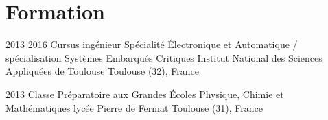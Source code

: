 \documentclass{custom_cv}
\begin{document}
\section{Formation}
\begin{Experience}
    \Item
    {2013}
    {2016}
    {Cursus ingénieur}
    {Spécialité Électronique et Automatique / spécialisation Systèmes Embarqués Critiques}
    {Institut National des Sciences Appliquées de Toulouse}
    {Toulouse (32), France}

    {2013}
    {Classe Préparatoire aux Grandes Écoles}
    {Physique, Chimie et Mathématiques}
    {lycée Pierre de Fermat}
    {Toulouse (31), France}
\end{Experience}
\end{document}
